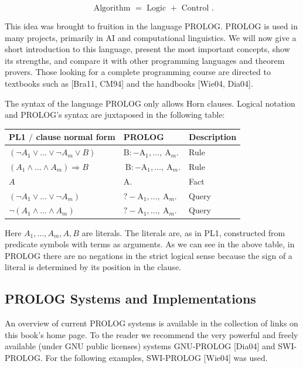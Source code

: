 \documentclass[10pt]{article}
\begin{document}
$$
\text { Algorithm }=\text { Logic }+ \text { Control } .
$$

This idea was brought to fruition in the language PROLOG. PROLOG is used in many projects, primarily in AI and computational linguistics. We will now give a short introduction to this language, present the most important concepts, show its strengths, and compare it with other programming languages and theorem provers. Those looking for a complete programming course are directed to textbooks such as [Bra11, CM94] and the handbooks [Wie04, Dia04].

The syntax of the language PROLOG only allows Horn clauses. Logical notation and PROLOG's syntax are juxtaposed in the following table:

\begin{center}
\begin{tabular}{lll}
\hline
PL1 $/$ clause normal form & PROLOG & Description \\
\hline
$\left(\neg A_{1} \vee \ldots \vee \neg A_{m} \vee B\right)$ & $\mathrm{B}:-\mathrm{A}_{1}, \ldots, \mathrm{~A}_{m}$. & Rule \\
\hline
$\left(A_{1} \wedge \ldots \wedge A_{m}\right) \Rightarrow B$ & $\mathrm{~B}:-\mathrm{A}_{1}, \ldots, \mathrm{~A}_{m}$. & Rule \\
\hline
$A$ & A. & Fact \\
\hline
$\left(\neg A_{1} \vee \ldots \vee \neg A_{m}\right)$ & $?-\mathrm{A}_{1}, \ldots, \mathrm{~A}_{m}$. & Query \\
\hline
$\neg\left(A_{1} \wedge \ldots \wedge A_{m}\right)$ & $?-\mathrm{A}_{1}, \ldots, \mathrm{~A}_{m}$. & Query \\
\hline
\end{tabular}
\end{center}

Here $A_{1}, \ldots, A_{m}, A, B$ are literals. The literals are, as in PL1, constructed from predicate symbols with terms as arguments. As we can see in the above table, in PROLOG there are no negations in the strict logical sense because the sign of a literal is determined by its position in the clause.

\subsection*{PROLOG Systems and Implementations}
An overview of current PROLOG systems is available in the collection of links on this book's home page. To the reader we recommend the very powerful and freely available (under GNU public licenses) systems GNU-PROLOG [Dia04] and SWI-PROLOG. For the following examples, SWI-PROLOG [Wie04] was used.
\end{document}
